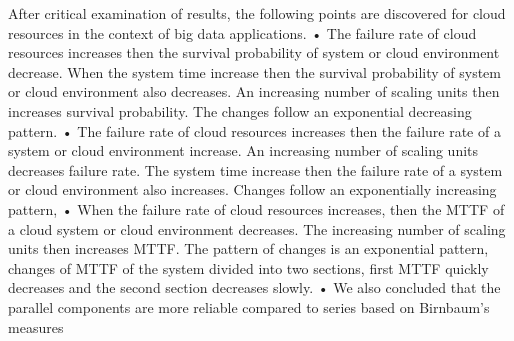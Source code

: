 After critical examination of results, the following points are discovered for cloud
resources in the context of big data applications.
• The failure rate of cloud resources increases then the survival probability of system
or cloud environment decrease. When the system time increase then the survival
probability of system or cloud environment also decreases. An increasing number of
scaling units then increases survival probability. The changes follow an exponential
decreasing pattern.
• The failure rate of cloud resources increases then the failure rate of a system or
cloud environment increase. An increasing number of scaling units decreases failure
rate. The system time increase then the failure rate of a system or cloud environment
also increases. Changes follow an exponentially increasing pattern,
• When the failure rate of cloud resources increases, then the MTTF of a cloud system
or cloud environment decreases. The increasing number of scaling units then
increases MTTF. The pattern of changes is an exponential pattern, changes of
MTTF of the system divided into two sections, first MTTF quickly decreases and
the second section decreases slowly.
• We also concluded that the parallel components are more reliable compared to
series based on Birnbaum’s measures